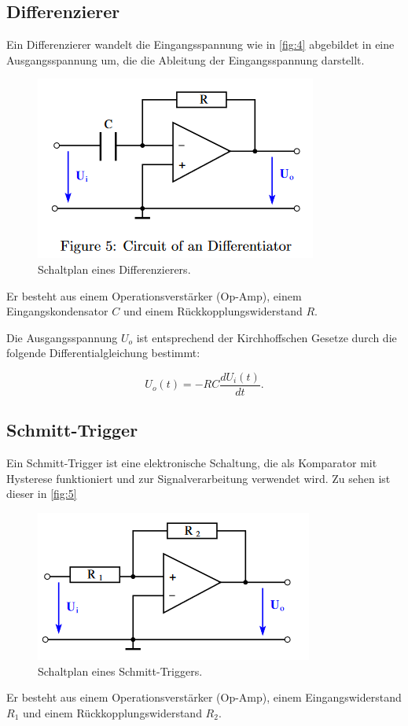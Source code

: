 \documentclass[12pt]{article}
\begin{document}
\subsection{Differenzierer}
Ein Differenzierer wandelt die Eingangsspannung wie in \autoref{fig:4} abgebildet in eine Ausgangsspannung um, die die Ableitung der Eingangsspannung darstellt.
\begin{figure}[H]
  \centering
  \includegraphics[scale=0.8]{Ressourcen/differentiator.png}
  \caption{Schaltplan eines Differenzierers\cite{anleitung}.}\label{fig:4}
\end{figure}
Er besteht aus einem Operationsverstärker (Op-Amp), einem Eingangskondensator \( C \) und einem Rückkopplungswiderstand \( R \).

Die Ausgangsspannung \( U_o \) ist entsprechend der Kirchhoffschen Gesetze durch die folgende Differentialgleichung bestimmt:

\begin{equation}
    U_o(t) = -RC \frac{dU_i(t)}{dt}.\label{eqn:diff}
\end{equation}
\subsection{Schmitt-Trigger}
Ein Schmitt-Trigger ist eine elektronische Schaltung, die als Komparator mit Hysterese funktioniert und zur Signalverarbeitung verwendet wird. Zu sehen ist dieser in \autoref{fig:5}
\begin{figure}[H]
  \centering
  \includegraphics[scale=0.8]{Ressourcen/schmitt.png}
  \caption{Schaltplan eines Schmitt-Triggers\cite{anleitung}.}\label{fig:5}
\end{figure}
Er besteht aus einem Operationsverstärker (Op-Amp), einem Eingangswiderstand \( R_1 \) und einem Rückkopplungswiderstand \( R_2 \).
\end{document}
